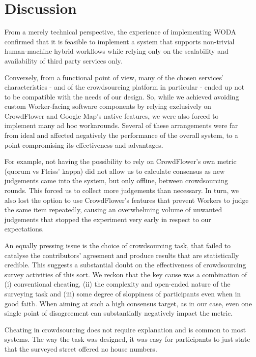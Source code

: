 \section{Discussion}

From a merely technical perspective, the experience of implementing WODA confirmed that it is feasible to implement a system that supports non-trivial human-machine hybrid workflows while relying only on the scalability and availability of third party services only.

Conversely, from a functional point of view, many of the chosen services' characteristics - and of the crowdsourcing platform in particular - ended up not to be compatible with the needs of our design. So, while we achieved avoiding custom Worker-facing software components by relying exclusively on CrowdFlower and Google Map's native features, we were also forced to implement many ad hoc workarounds. Several of these arrangements were far from ideal and affected negatively the performance of the overall system, to a point compromising its effectiveness and advantages. 

For example, not having the possibility to rely on CrowdFlower's own metric (quorum vs Fleiss' kappa) did not allow us to calculate consensus as new judgements came into the system, but only offline, between crowdsourcing rounds. This forced us to collect more judgements than necessary. In turn, we also lost the option to use CrowdFlower's features that prevent Workers to judge the same item repeatedly, causing an overwhelming volume of unwanted judgements that stopped the experiment very early in respect to our expectations. 

An equally pressing issue is the choice of crowdsourcing task, that failed to catalyse the contributors' agreement and produce results that are statistically credible. This suggests a substantial doubt on the effectiveness of crowdsourcing survey activities of this sort. We reckon that the key cause was a combination of (i) conventional cheating, (ii) the complexity and open-ended nature of the surveying task and (iii) some degree of sloppiness of participants even when in good faith. When aiming at such a high consensus target, as in our case, even one single point of disagreement can substantially negatively impact the metric.

Cheating in crowdsourcing does not require explanation and is common to most systems. The way the task was designed, it was easy for participants to just state that the surveyed street offered no house numbers. 

